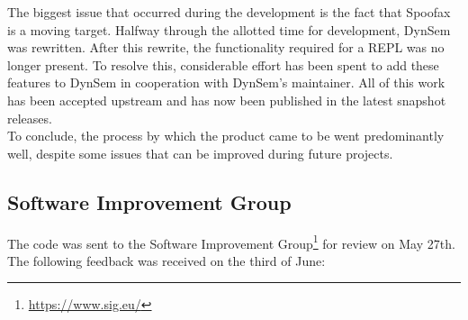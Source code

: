 The biggest issue that occurred during the development is the fact that Spoofax
is a moving target. Halfway through the allotted time for development, DynSem
was rewritten. After this rewrite, the functionality required for
a REPL was no longer present. To resolve this, considerable effort has been spent
to add these features to DynSem in cooperation with DynSem's maintainer. All of
this work has been accepted upstream and has now been published in the latest
snapshot releases.\\

To conclude, the process by which the product came to be went predominantly
well, despite some issues that can be improved during future projects.

\subsection{Software Improvement Group}
\label{ssec:sig}

The code was sent to the Software Improvement
Group\footnote{\url{https://www.sig.eu/}} for review on May 27th. The following
feedback was received on the third of June:

